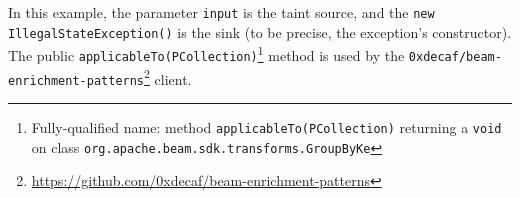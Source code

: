 



In this example, the parameter \texttt{input} is the taint source, and the \texttt{new IllegalStateException()} is the sink (to be precise, the exception's constructor). The public \texttt{applicableTo(PCollection)}\footnote{Fully-qualified name: method \texttt{applicableTo(PCollection)} returning a \texttt{void} on class \texttt{org.apache.beam.sdk.transforms.GroupByKe}} method is used by the \texttt{0xdecaf/beam-enrichment-patterns}\footnote{\url{https://github.com/0xdecaf/beam-enrichment-patterns}} client.



